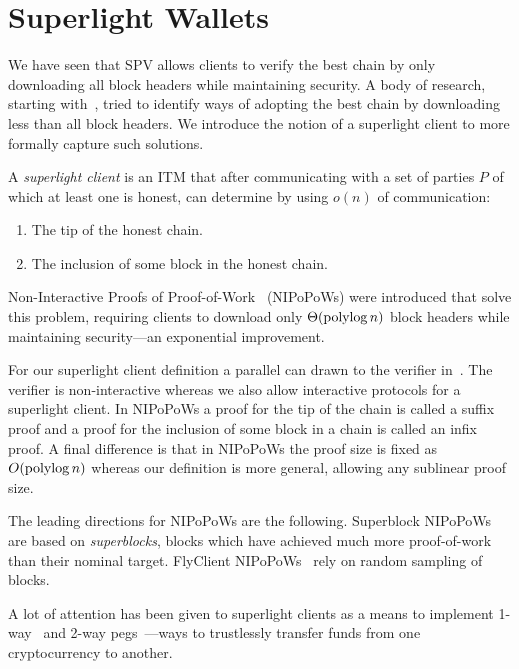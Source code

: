\section{Superlight Wallets}
\label{superlight}
We have seen that SPV allows clients to verify the best chain by only downloading all block headers while maintaining security. A body of research, starting with~\cite{highway,friedenbach}, tried to identify ways of adopting the best chain by downloading less than all block headers. We introduce the notion of a superlight client to more formally capture such solutions. 

\begin{definition}
A \emph{superlight client} is an ITM that after communicating with a set of parties $P$ of which at least one is honest, can determine by using $o(n)$ of communication:
\begin{enumerate}
    \item The tip of the honest chain.
    \item The inclusion of some block in the honest chain.
\end{enumerate}
\end{definition}

Non-Interactive Proofs of Proof-of-Work~\cite{kls,nipopows,flyclient} (NIPoPoWs) were introduced that solve this problem, requiring clients to download only $\Theta(\operatorname{polylog}{n})$ block headers while maintaining security---an exponential improvement.

For our superlight client definition a parallel can drawn to the verifier in~\cite{nipopows}. The verifier is non-interactive whereas we also allow interactive protocols for a superlight client. In NIPoPoWs a proof for the tip of the chain is called a suffix proof and a proof for the inclusion of some block in a chain is called an infix proof. A final difference is that in NIPoPoWs the proof size is fixed as $O(\operatorname{polylog}{n})$ whereas our definition is more general, allowing any sublinear proof size.

The leading directions for NIPoPoWs are the following.
Superblock NIPoPoWs~\cite{nipopows,compactsuperblocks} are based on \emph{superblocks}, blocks which have achieved much more proof-of-work than their nominal target. FlyClient NIPoPoWs~\cite{flyclient} rely on random sampling of blocks.

A lot of attention has been given to superlight clients as a means to implement 1-way~\cite{burn} and 2-way pegs~\cite{sidechains,pow-sidechains}---ways to trustlessly transfer funds from one cryptocurrency to another.

